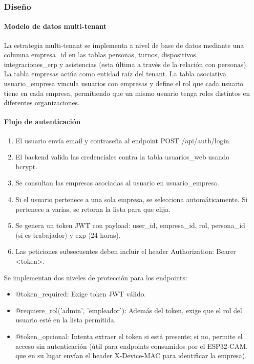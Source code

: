 \subsubsection{Diseño}

\paragraph{Modelo de datos multi-tenant}

La estrategia multi-tenant se implementa a nivel de base de datos mediante una columna empresa\_id en las tablas personas, turnos, dispositivos, integraciones\_erp y asistencias (esta última a través de la relación con personas). La tabla empresas actúa como entidad raíz del tenant. La tabla asociativa usuario\_empresa vincula usuarios con empresas y define el rol que cada usuario tiene en cada empresa, permitiendo que un mismo usuario tenga roles distintos en diferentes organizaciones.

\paragraph{Flujo de autenticación}

\begin{enumerate}
    \item El usuario envía email y contraseña al endpoint POST /api/auth/login.
    \item El backend valida las credenciales contra la tabla usuarios\_web usando bcrypt.
    \item Se consultan las empresas asociadas al usuario en usuario\_empresa.
    \item Si el usuario pertenece a una sola empresa, se selecciona automáticamente. Si pertenece a varias, se retorna la lista para que elija.
    \item Se genera un token JWT con payload: user\_id, empresa\_id, rol, persona\_id (si es trabajador) y exp (24 horas).
    \item Las peticiones subsecuentes deben incluir el header Authorization: Bearer <token>.
\end{enumerate}

Se implementan dos niveles de protección para los endpoints:
\begin{itemize}
    \item @token\_required: Exige token JWT válido.
    \item @requiere\_rol('admin', 'empleador'): Además del token, exige que el rol del usuario esté en la lista permitida.
    \item @token\_opcional: Intenta extraer el token si está presente; si no, permite el acceso sin autenticación (útil para endpoints consumidos por el ESP32-CAM, que en su lugar envían el header X-Device-MAC para identificar la empresa).
\end{itemize}

